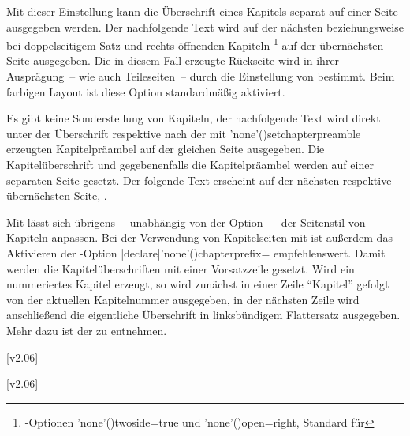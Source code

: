 \begin{DeclareEntity*}{}
\begin{DeclareEntity*}{}
\begin{DeclareEntity*}{}
\begin{Declaration}
Mit dieser Einstellung kann die Überschrift eines Kapitels separat auf einer 
Seite ausgegeben werden. Der nachfolgende Text wird auf der nächsten 
beziehungsweise bei doppelseitigem Satz und rechts öffnenden Kapiteln%
\footnote{%
  \KOMAScript-Optionen \Option'none'(){twoside=true} und 
  \Option'none'(){open=right}, Standard für 
}
auf der übernächsten Seite ausgegeben. Die in diesem Fall erzeugte Rückseite 
wird in ihrer Ausprägung~-- wie auch Teileseiten~-- durch die Einstellung von 
 bestimmt. Beim farbigen Layout ist diese Option 
standardmäßig aktiviert. \notudscrartcl
\begin{DeclareValues}[Vakatseiten]{}
  Es gibt keine Sonderstellung von Kapiteln, der nachfolgende Text wird direkt 
  unter der Überschrift respektive nach der mit 
  \Macro'none'(){setchapterpreamble} erzeugten 
  Kapitelpräambel auf der gleichen Seite ausgegeben.
  Die Kapitelüberschrift und gegebenenfalls die Kapitelpräambel werden auf 
  einer separaten Seite gesetzt. Der folgende Text erscheint auf der nächsten 
  respektive übernächsten Seite, .
\end{DeclareValues}

%
Mit 
lässt sich übrigens~-- unabhängig von der Option ~-- der 
Seitenstil von Kapiteln anpassen. Bei der Verwendung von Kapitelseiten mit 
 ist außerdem das Aktivieren der \KOMAScript-Option 
\Option|declare|'none'(){chapterprefix=\PBoolean} 
empfehlenswert. Damit werden die Kapitelüberschriften mit einer Vorsatzzeile 
gesetzt. Wird ein nummeriertes Kapitel erzeugt, so wird zunächst in einer Zeile 
\enquote{Kapitel} gefolgt von der aktuellen Kapitelnummer ausgegeben, in der 
nächsten Zeile wird anschließend die eigentliche Überschrift in linksbündigem 
Flattersatz ausgegeben. Mehr dazu ist der  
zu entnehmen.
\end{Declaration}

\begin{Declaration}
  {}
  [v2.06]
\begin{Declaration}
  {}
  [v2.06]
\printdeclarationlist[Schriftelemente]


\end{Declaration}
\end{Declaration}
\end{DeclareEntity*}
\end{DeclareEntity*}
\end{DeclareEntity*}
